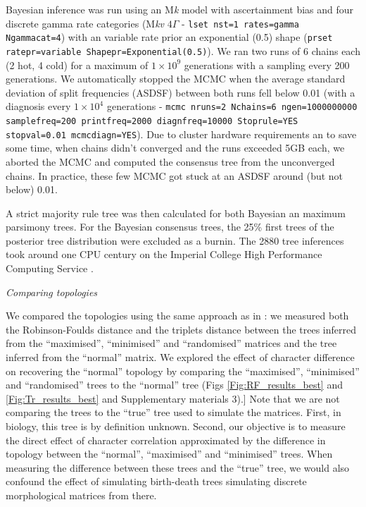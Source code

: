 \documentclass[12pt,letterpaper]{article}
\renewcommand{\subsection}[1]{%
\bigskip
\begin{center}
\begin{large}
\normalfont\itshape #1
\end{large}
\end{center}}
\begin{document}
Bayesian inference was run using an M\textit{k} model with ascertainment bias and four discrete gamma rate categories (M\textit{kv} $4\Gamma$ - \texttt{lset nst=1 rates=gamma Ngammacat=4}) with an variable rate prior an exponential (0.5) shape (\texttt{prset ratepr=variable Shapepr=Exponential(0.5)}).
We ran two runs of 6 chains each (2 hot, 4 cold) for a maximum of $1\times10^9$ generations with a sampling every 200 generations.
We automatically stopped the MCMC when the average standard deviation of split frequencies (ASDSF) between both runs fell below 0.01 (with a diagnosis every $1\times10^4$ generations - \texttt{mcmc nruns=2 Nchains=6 ngen=1000000000 samplefreq=200 printfreq=2000 diagnfreq=10000 Stoprule=YES stopval=0.01 mcmcdiagn=YES}).
Due to cluster hardware requirements an to save some time, when chains didn't converged and the runs exceeded 5GB each, we aborted the MCMC and computed the consensus tree from the unconverged chains.
In practice, these few MCMC got stuck at an ASDSF around (but not below) 0.01.

A strict majority rule tree was then calculated for both Bayesian an maximum parsimony trees.
For the Bayesian consensus trees, the 25\% first trees of the posterior tree distribution were excluded as a burnin.
The 2880 tree inferences took around one CPU century on the Imperial College High Performance Computing Service \citep[2-3GHz clock rate;][]{HPC}.

\subsection{Comparing topologies}
We compared the topologies using the same approach as in \cite{Guillerme2016146}: we measured both the Robinson-Foulds distance \citep{RF1981} and the triplets distance \citep{dobson1975triplets} between the trees inferred from the ``maximised'', ``minimised'' and ``randomised'' matrices and the tree inferred from the ``normal'' matrix.
We explored the effect of character difference on recovering the ``normal'' topology by comparing the ``maximised'', ``minimised'' and ``randomised'' trees to the ``normal'' tree (Figs \ref{Fig:RF_results_best} and \ref{Fig:Tr_results_best} and Supplementary materials 3).]
Note that we are not comparing the trees to the ``true'' tree used to simulate the matrices.
First, in biology, this tree is by definition unknown.
Second, our objective is to measure the direct effect of character correlation approximated by the difference in topology between the ``normal'', ``maximised'' and ``minimised'' trees.
When measuring the difference between these trees and the ``true'' tree, we would also confound the effect of simulating birth-death trees simulating discrete morphological matrices from there.
\end{document}
